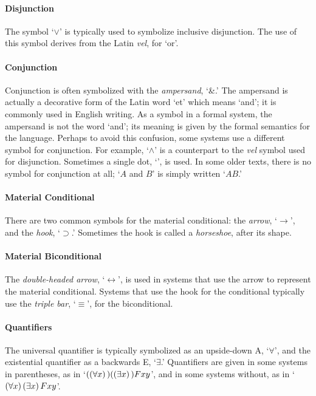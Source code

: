 \paragraph{Disjunction} The symbol `$\vee$' is typically used to symbolize inclusive disjunction. The use of this symbol derives from the Latin \emph{vel}, for `or'.

\paragraph{Conjunction}
Conjunction is often symbolized with the \emph{ampersand}, `{\&}.' The ampersand is actually a decorative form of the Latin word `et' which means `and'; it is commonly used in English writing. As a symbol in a formal system, the ampersand is not the word `and'; its meaning is given by the formal semantics for the language. Perhaps to avoid this confusion, some systems use a different symbol for conjunction. For example, `$\wedge$' is a counterpart to the \emph{vel} symbol used for disjunction. Sometimes a single dot, `{\scriptsize\textbullet}', is used. In some older texts, there is no symbol for conjunction at all; `$A$ and $B$' is simply written `$AB$.'

\paragraph{Material Conditional} There are two common symbols for the material conditional: the \emph{arrow}, `$\rightarrow$', and the \emph{hook}, `$\supset$.' Sometimes the hook is called a \emph{horseshoe}, after its shape.

\paragraph{Material Biconditional} The \emph{double-headed arrow}, `$\leftrightarrow$', is used in systems that use the arrow to represent the material conditional. Systems that use the hook for the conditional typically use the \emph{triple bar}, `$\equiv$', for the biconditional.

\paragraph{Quantifiers} The universal quantifier is typically symbolized as an upside-down A, `$\forall$', and the existential quantifier as a backwards E, `$\exists$.' Quantifiers are given in some systems in parentheses, as in `$((\forall x) \,)((\exists x) \,)Fxy$', and in some systems without, as in `$(\forall x) \,(\exists x) \, Fxy$'.

